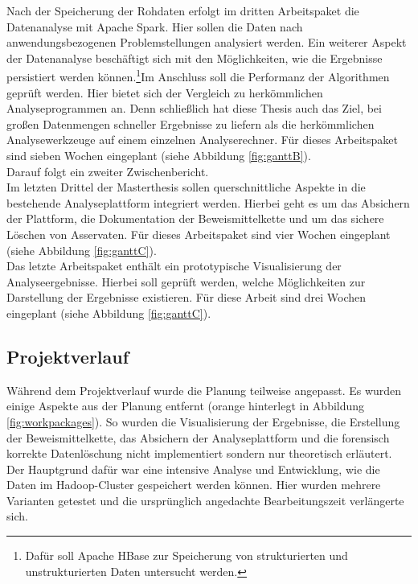 \noindent
Nach der Speicherung der Rohdaten erfolgt im dritten Arbeitspaket die Datenanalyse mit Apache Spark. Hier sollen die Daten nach anwendungsbezogenen Problemstellungen analysiert werden. Ein weiterer Aspekt der Datenanalyse beschäftigt sich mit den Möglichkeiten, wie die Ergebnisse persistiert werden können.\footnote{Dafür soll Apache HBase zur Speicherung von strukturierten und unstrukturierten Daten untersucht werden.}Im Anschluss soll die Performanz der Algorithmen geprüft werden. Hier bietet sich der Vergleich zu herkömmlichen Analyseprogrammen an. Denn schließlich hat diese Thesis auch das Ziel, bei großen Datenmengen schneller Ergebnisse zu liefern als die herkömmlichen Analysewerkzeuge auf einem einzelnen Analyserechner. Für dieses Arbeitspaket sind sieben Wochen eingeplant (siehe Abbildung \ref{fig:ganttB}).\\
 Darauf folgt ein zweiter Zwischenbericht.\\

\noindent
Im letzten Drittel der Masterthesis sollen querschnittliche Aspekte in die bestehende Analyseplattform integriert werden. Hierbei geht es um das Absichern der Plattform, die Dokumentation der Beweismittelkette und um das sichere Löschen von Asservaten. Für dieses Arbeitspaket sind vier Wochen eingeplant (siehe Abbildung \ref{fig:ganttC}).\\

\noindent
Das letzte Arbeitspaket enthält ein prototypische Visualisierung der Analyseergebnisse. Hierbei soll geprüft werden, welche Möglichkeiten zur Darstellung der Ergebnisse existieren. Für diese Arbeit sind drei Wochen eingeplant (siehe Abbildung \ref{fig:ganttC}).\\

\subsection*{Projektverlauf}
Während dem Projektverlauf wurde die Planung teilweise angepasst. Es wurden einige Aspekte aus der Planung entfernt (orange hinterlegt in Abbildung \ref{fig:workpackages}). So wurden die Visualisierung der Ergebnisse, die Erstellung der Beweismittelkette, das Absichern der Analyseplattform und die forensisch korrekte Datenlöschung nicht implementiert sondern nur theoretisch erläutert. Der Hauptgrund dafür war eine intensive Analyse und Entwicklung, wie die Daten im Hadoop-Cluster gespeichert werden können. Hier wurden mehrere Varianten getestet und die ursprünglich angedachte Bearbeitungszeit verlängerte sich.\\


